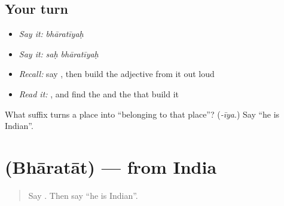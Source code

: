 \subsection*{Your turn}
\begin{itemize}
\raggedright
  \item \emph{Say it:} \emph{bhāratīyaḥ}
  \item \emph{Say it:} \emph{saḥ bhāratīyaḥ}
  \item \emph{Recall:} say \textbf{}, then build the adjective from it out loud
  \item \emph{Read it:} \textbf{}, and find the \textbf{} and the \textbf{} that build it
\end{itemize}

\begin{tcolorbox}[breakable,colback=teal!4,colframe=teal!35!black,title={Before you move on}]
What suffix turns a place into \textquotedblleft{}belonging to that place\textquotedblright{}? (\emph{-īya}.) Say \textquotedblleft{}he is Indian\textquotedblright{}.
\end{tcolorbox}
\section[\texorpdfstring{\sk{भारतात्} (Bhāratāt)}{भारतात् (Bhāratāt)}]{ (Bhāratāt) — from India}

\label{lesson:SA-C59-bharatat}



\begin{quote}
Say \textbf{}. Then say \textquotedblleft{}he is Indian\textquotedblright{}.
\end{quote}

